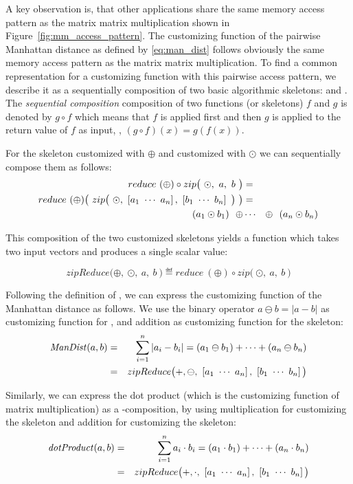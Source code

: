 A key observation is, that other applications share the same memory access pattern as the matrix matrix multiplication shown in Figure~\ref{fig:mm_access_pattern}.
The customizing function of the pairwise Manhattan distance as defined by \autoref{eq:man_dist} follows obviously the same memory access pattern as the matrix matrix multiplication.
To find a common representation for a customizing function with this pairwise access pattern, we describe it as a sequentially composition of two basic algorithmic skeletons: \zip and \reduce.
The \emph{sequential composition} composition of two functions (or skeletons) $f$ and $g$ is denoted by $g \circ f$ which means that $f$ is applied first and then $g$ is applied to the return value of $f$ as input, \ie, $(g\circ f)(x) = g(f(x))$.

For the \reduce skeleton customized with $\oplus$ and \zip customized with $\odot$ we can sequentially compose them as follows:
\begin{eqnarray*}
  reduce\ (\oplus) \circ zip\big(\ \odot,\ a,\ b\ \big) &=&\\
  reduce\ (\oplus) \big(\ zip\big(\ \odot,\ \DottedVector{a_1}{a_n},\ \DottedVector{b_1}{b_n}\ \big)\ \big) &=&\\
  (a_1 \odot b_1)\ \ \oplus &\cdots& \oplus\ \ (a_n \odot b_n)
\end{eqnarray*}

This composition of the two customized skeletons yields a function which takes two input vectors and produces a single scalar value:

\begin{equation*}
  zipReduce\big(\oplus,\ \odot,\ a,\ b\ \big) \eqdef 
  reduce\ (\oplus) \circ zip\big(\ \odot,\ a,\ b\ \big)
\end{equation*}

Following the definition of \zipReduce, we can express the customizing function of the Manhattan distance as follows.
We use the binary operator $a \ominus b = |a - b|$ as customizing function for \zip, and addition as customizing function for the \reduce skeleton:
\begin{eqnarray*}
    \ManDist(a, b) &=& \sum_{i=1}^{n} | a_i - b_i | = (a_1 \ominus b_1) + \cdots + (a_n \ominus b_n)\\
    &=& zipReduce\big(+, \ominus,\ \DottedVector{a_1}{a_n},\ \DottedVector{b_1}{b_n}\big)
\end{eqnarray*}

Similarly, we can express the dot product (which is the customizing function of matrix multiplication) as a \zip-\reduce composition, by using multiplication for customizing the \zip skeleton and addition for customizing the \reduce skeleton:
\begin{eqnarray*}
  \dotProduct(a, b) &=& \sum_{i = 1}^{n} a_i \cdot b_i = (a_1 \cdot b_1) + \cdots + (a_n \cdot b_n)\\
  &=& zipReduce\big(+, \cdot,\ \DottedVector{a_1}{a_n},\ \DottedVector{b_1}{b_n}\big)
\end{eqnarray*}


